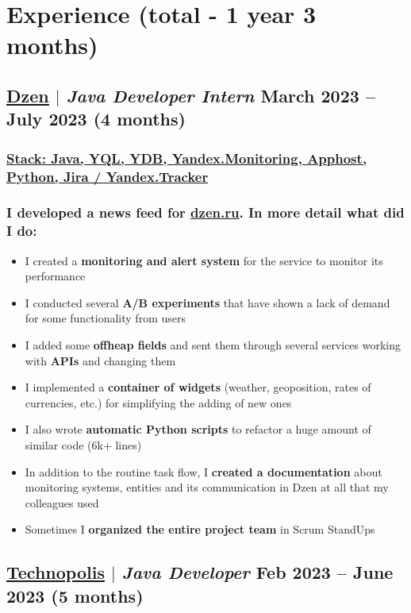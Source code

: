 \documentclass[11pt]{article}
\begin{document}
\section{Experience (total - 1 year 3 months)}
\subsection{\href{https://dzen.ru}{\underline{Dzen}} $|$ {\normalfont\textit{Java Developer Intern}} \hfill March 2023 -- July 2023 (4 months)}
\subsubsection{\underline{\textbf{Stack}: Java, YQL, YDB, Yandex.Monitoring, \href{https://habr.com/ru/companies/yandex/articles/520134/}{Apphost}, Python, Jira / Yandex.Tracker}}
\subsubsection{I developed a news feed for \href{https://dzen.ru}{\underline{dzen.ru}}. In more detail what did I do:}
\begin{itemize}
    \item I created a \textbf{monitoring and alert system} for the service to monitor its performance
    \item I conducted several \textbf{A/B experiments} that have shown a lack of demand for some functionality from users
    \item I added some \textbf{offheap fields} and sent them through several services working with \textbf{APIs} and changing them 
    \item I implemented a \textbf{container of widgets} (weather, geoposition, rates of currencies, etc.) for simplifying the adding of new ones
    \item I also wrote \textbf{automatic Python scripts} to refactor a huge amount of similar code (6k+ lines)
    \item In addition to the routine task flow, I \textbf{created a documentation} about monitoring systems, entities and its communication in Dzen at all that my colleagues used
    \item Sometimes I \textbf{organized the entire project team} in Scrum StandUps
\end{itemize}

\subsection{\href{https://polis.vk.company/}{\underline{Technopolis}} $|$ {\normalfont\textit{Java Developer}} \hfill Feb 2023 -- June 2023 (5 months)}
\end{document}
